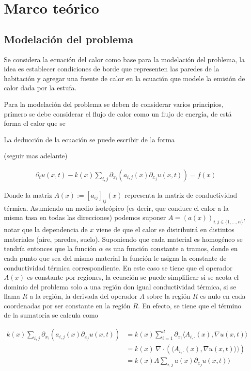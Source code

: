 \documentclass[12pt,paperletter]{article}
\begin{document}
\newpage
\section{Marco teórico}

\subsection{Modelación del problema}
Se considera la ecuación del calor como base para la modelación del problema, la idea es establecer condiciones de borde que representen las paredes de la habitación y agregar una fuente de calor en la ecuación que modele la emisión de calor dada por la estufa. 

Para la modelación del problema se deben de considerar varios principios, primero se debe considerar el flujo de calor como un flujo de energía, de está forma el calor que se 


La deducción de la ecuación se puede escribir de la forma 

(seguir mas adelante)

\begin{align}
    \label{eqn:gnral}
    \partial_t u(x,t) - k(x) \sum_{i,j} \partial_{x_i} (a_{i,j} (x) \partial_{x_j} u(x,t)  )  = f(x) 
\end{align}

Donde la matriz $A(x):= [a_{ij}]_{ij}(x)$ representa la matriz de conductividad térmica. Asumiendo un medio isotrópico (es decir, que conduce el calor a la misma tasa en todas las direcciones) podemos suponer $A = (a(x))_{i,j \in \{1,...,n\}},$ notar que la dependencia de $x$ viene de que el calor se distribuirá en distintos materiales (aire, paredes, suelo). Suponiendo que cada material es homogéneo se tendría entonces que la función $\alpha$ es una función constante a tramos, donde en cada punto que sea del mismo material la función le asigna la constante de conductividad térmica correspondiente. En este caso se tiene que el operador $A(x)$ es constante por regiones, la ecuación se puede simplificar si se acota el dominio del problema solo a una región don igual conductividad térmica, si se llama $R$ a la región, la derivada del operador $A$ sobre la región $R$ es nulo en cada coordenadas por ser constante en la región $R$. En efecto, se tiene que el término de la sumatoria se calcula como

\begin{align*}
    k(x) \sum_{i,j} \partial_{x_i} (a_{i,j} (x) \partial_{x_j} u(x,t)  )  &= k(x)\sum_{i = 1 }^{d}  \partial_{x_i} \langle  A_{i,\cdot} (x), \nabla u (x,t) \rangle  \\
    &=  k(x)\
     \nabla \cdot \left(\langle  A_{i,\cdot} (x), \nabla u (x,t) \rangle  )\right)\\
    &= k(x) A\sum_{i,j}  a (x) \partial_{x_j} u(x,t)  )
\end{align*}
\end{document}
